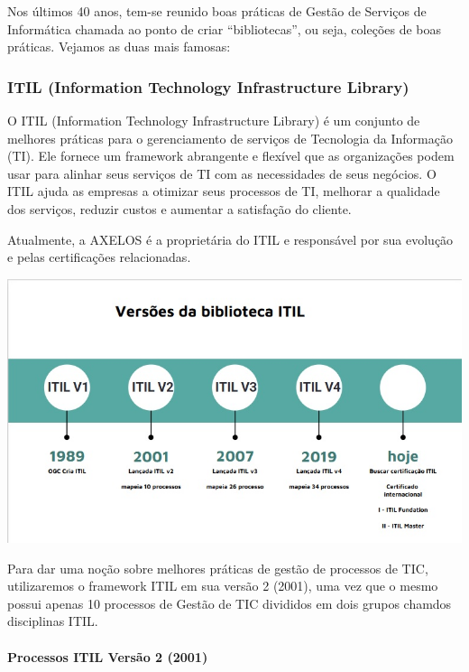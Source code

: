 \documentclass[
]{book}
\begin{document}
Nos últimos 40 anos, tem-se reunido boas práticas de Gestão de Serviços de Informática chamada ao ponto de criar ``bibliotecas'', ou seja, coleções de boas práticas. Vejamos as duas mais famosas:

\subsubsection{ITIL (Information Technology Infrastructure Library)}\label{itil-information-technology-infrastructure-library}

O ITIL (Information Technology Infrastructure Library) é um conjunto de melhores práticas para o gerenciamento de serviços de Tecnologia da Informação (TI). Ele fornece um framework abrangente e flexível que as organizações podem usar para alinhar seus serviços de TI com as necessidades de seus negócios. O ITIL ajuda as empresas a otimizar seus processos de TI, melhorar a qualidade dos serviços, reduzir custos e aumentar a satisfação do cliente.

Atualmente, a AXELOS é a proprietária do ITIL e responsável por sua evolução e pelas certificações relacionadas.

\includegraphics{images/InfraEstrutura/ITIL/Linha_do_Tempo.jpg}

Para dar uma noção sobre melhores práticas de gestão de processos de TIC, utilizaremos o framework ITIL em sua versão 2 (2001), uma vez que o mesmo possui apenas 10 processos de Gestão de TIC divididos em dois grupos chamdos disciplinas ITIL.

\paragraph{Processos ITIL Versão 2 (2001)}\label{processos-itil-versuxe3o-2-2001}
\end{document}
